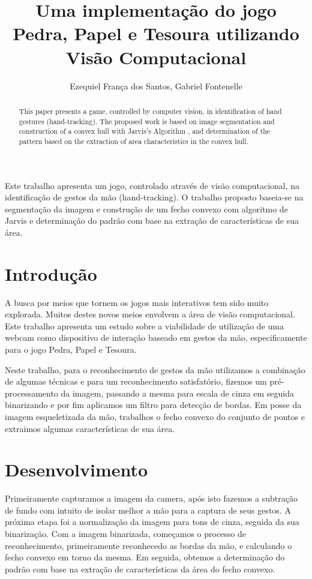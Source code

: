 \documentclass[12pt]{article}
\title{Uma implementação do jogo Pedra, Papel e Tesoura utilizando Visão Computacional}
\author{Ezequiel França dos Santos\inst{1}, Gabriel Fontenelle\inst{1}}
\begin{document}
 
\maketitle

\begin{abstract}
This paper presents a game, controlled by computer vision, in identification of hand gestures (hand-tracking). The proposed work is based on image segmentation and construction of a convex hull with Jarvis's Algorithm , and determination of the pattern based on the extraction of area characteristics in the convex hull.
\end{abstract}
     
\begin{resumo} 
Este trabalho apresenta um jogo, controlado através de visão computacional, na identificação de gestos da mão (hand-tracking). O trabalho proposto baseia-se na segmentação da imagem e construção de um fecho convexo com algoritmo de Jarvis e determinação do padrão com base na extração de características de sua área.
\end{resumo}


\section{Introdução}

A busca por meios que tornem os jogos mais interativos tem sido muito explorada. Muitos destes novos meios envolvem a área de visão computacional. Este trabalho apresenta um estudo sobre a viabilidade de utilização de uma webcam como dispositivo de interação baseado em gestos da mão, especificamente para o jogo Pedra, Papel e Tesoura. 

Neste trabalho, para o reconhecimento de gestos da mão utilizamos a combinação de algumas técnicas e para um reconhecimento satisfatório, fizemos um pré-processamento da imagem, passando a mesma para escala de cinza em seguida binarizando e por fim aplicamos um filtro para detecção de bordas. Em posse da imagem esqueletizada da mão, trabalhos o fecho convexo do conjunto de pontos e extraimos algumas características de sua área. 

\section{Desenvolvimento}

Primeiramente capturamos a imagem da camera, após isto fazemos a subtração de fundo com intuito de isolar melhor a mão para a captura de seus gestos. A próxima etapa foi a normalização da imagem para tons de cinza, seguida da sua binarização. Com a imagem binarizada, começamos o processo de reconhecimento, primeiramente reconhecedo as bordas da mão, e calculando o fecho convexo em torno da mesma. Em seguida, obtemos a determinação do padrão com base na extração de características da área do fecho convexo.
\end{document}
